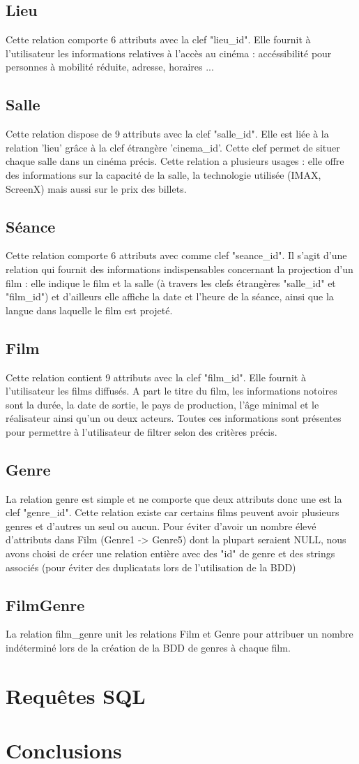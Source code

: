 \documentclass[12pt]{article}
\begin{document}
\subsection*{Lieu}
Cette relation comporte 6 attributs avec la clef "lieu{\_}id". Elle fournit à l'utilisateur les informations
relatives à l'accès au cinéma : accéssibilité pour personnes à mobilité réduite, adresse, horaires ...
\subsection*{Salle}
Cette relation dispose de 9 attributs avec la clef "salle{\_}id".
Elle est liée à la relation 'lieu' grâce à la clef étrangère 'cinema{\_}id'. Cette clef permet de situer chaque salle
dans un cinéma précis. Cette relation a plusieurs usages : elle offre des informations sur la capacité de la salle,
la technologie utilisée (IMAX, ScreenX) mais aussi sur le prix des billets.
\subsection*{Séance}
Cette relation comporte 6 attributs avec comme clef "seance{\_}id". Il s'agit d'une relation qui fournit des informations
indispensables concernant la projection d'un film : elle indique le film et la salle (à travers les clefs étrangères "salle{\_}id"
et "film{\_}id") et d'ailleurs elle affiche la date et l'heure de la séance, ainsi que la langue dans laquelle le film est projeté.
\subsection*{Film}
Cette relation contient 9 attributs avec la clef "film{\_}id". Elle fournit à l'utilisateur les films diffusés.
A part le titre du film, les informations notoires sont la durée, la date de sortie, le pays de production, l'âge minimal
et le réalisateur ainsi qu'un ou deux acteurs. Toutes ces informations sont présentes pour permettre à l'utilisateur de filtrer selon des critères précis.
\subsection*{Genre}
La relation genre est simple et ne comporte que deux attributs donc une est la clef "genre{\_}id". 
Cette relation existe car certains films peuvent avoir plusieurs genres et d'autres un seul ou aucun. Pour éviter d'avoir 
un nombre élevé d'attributs dans Film (Genre1 -> Genre5) dont la plupart seraient NULL, nous avons choisi de créer une 
relation entière avec des "id" de genre et des strings associés (pour éviter des duplicatats lors de l'utilisation de la BDD)
\subsection*{FilmGenre}
La relation film{\_}genre unit les relations Film et Genre pour attribuer un nombre indéterminé lors de la création de la BDD de genres à chaque film.
\pagebreak
\section{Requêtes SQL}
\pagebreak
\section{Conclusions}
\end{document}
